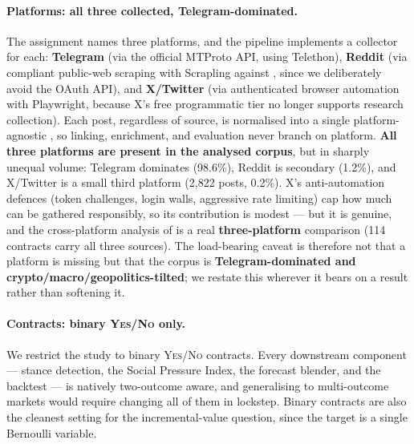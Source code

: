 \paragraph{Platforms: all three collected, Telegram-dominated.}
The assignment names three platforms, and the pipeline implements a collector for
each: \textbf{Telegram} (via the official MTProto API, using Telethon),
\textbf{Reddit} (via compliant public-web scraping with Scrapling against
, since we deliberately avoid the OAuth API), and
\textbf{X/Twitter} (via authenticated browser automation with Playwright, because X's
free programmatic tier no longer supports research collection). Each post, regardless
of source, is normalised into a single platform-agnostic , so
linking, enrichment, and evaluation never branch on platform. \textbf{All three
platforms are present in the analysed corpus}, but in sharply unequal volume: Telegram
dominates (98.6\%), Reddit is secondary (1.2\%), and X/Twitter is a small third
platform (2{,}822 posts, 0.2\%). X's anti-automation defences (token challenges, login
walls, aggressive rate limiting) cap how much can be gathered responsibly, so its
contribution is modest --- but it is genuine, and the cross-platform analysis of
 is a real \textbf{three-platform} comparison (114 contracts
carry all three sources). The load-bearing caveat is therefore not that a platform is
missing but that the corpus is \textbf{Telegram-dominated and
crypto/macro/geopolitics-tilted}; we restate this wherever it bears on a result rather
than softening it.

\paragraph{Contracts: binary \textsc{Yes}/\textsc{No} only.}
We restrict the study to binary \textsc{Yes}/\textsc{No} contracts. Every downstream
component --- stance detection, the Social Pressure Index, the forecast blender, and
the backtest --- is natively two-outcome aware, and generalising to multi-outcome
markets would require changing all of them in lockstep. Binary contracts are also
the cleanest setting for the incremental-value question, since the target is a
single Bernoulli variable.

